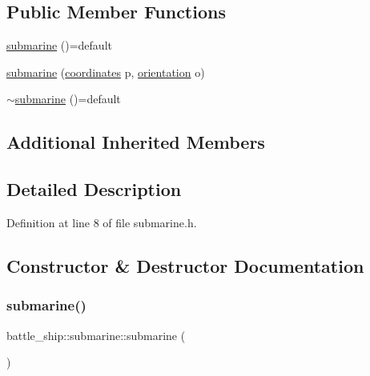 \subsection*{Public Member Functions}
\begin{DoxyCompactItemize}
\item 
\hyperlink{classbattle__ship_1_1submarine_a52a8062290d2f36e162fc033a3917c5a}{submarine} ()=default
\item 
\hyperlink{classbattle__ship_1_1submarine_a229d0577e45bd964f4d32b50506c9504}{submarine} (\hyperlink{structbattle__ship_1_1coordinates}{coordinates} p, \hyperlink{namespacebattle__ship_aed87488f0a73f0d0679fe343fb61c784}{orientation} o)
\item 
\hyperlink{classbattle__ship_1_1submarine_a03b3a1b0c62de507e2b3a4d9ec1de06f}{$\sim$submarine} ()=default
\end{DoxyCompactItemize}
\subsection*{Additional Inherited Members}


\subsection{Detailed Description}


Definition at line 8 of file submarine.\+h.



\subsection{Constructor \& Destructor Documentation}
\mbox{\label{classbattle__ship_1_1submarine_a52a8062290d2f36e162fc033a3917c5a}} 
\subsubsection{\texorpdfstring{submarine()}{submarine()}\hspace{0.1cm}{\footnotesize\ttfamily [1/2]}}
{\footnotesize\ttfamily battle\+\_\+ship\+::submarine\+::submarine (\begin{DoxyParamCaption}{ }\end{DoxyParamCaption})\hspace{0.3cm}{\ttfamily [default]}}

